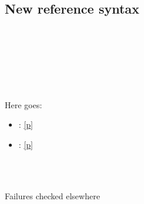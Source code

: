 {\subsection{New reference syntax\label{new-reference-syntax}}%
\label{module-Ocamlary-module-type-M}\begin{ocamlindent}\label{module-Ocamlary-module-type-M-type-t}\\
\end{ocamlindent}%
\\
\label{module-Ocamlary-module-M}\begin{ocamlindent}\label{module-Ocamlary-module-M-type-t}\\
\end{ocamlindent}%
\\
Here goes:

\begin{itemize}\item{ : \hyperref[module-Ocamlary-module-M-type-t]{[p\pageref*{module-Ocamlary-module-M-type-t}]}}%
\item{ : \hyperref[module-Ocamlary-module-type-M-type-t]{[p\pageref*{module-Ocamlary-module-type-M-type-t}]}}\end{itemize}%
\label{module-Ocamlary-module-Only+u+a+u+module}\begin{ocamlindent}\label{module-Ocamlary-module-Only+u+a+u+module-type-t}\\
\end{ocamlindent}%
\\
Failures checked elsewhere

}
